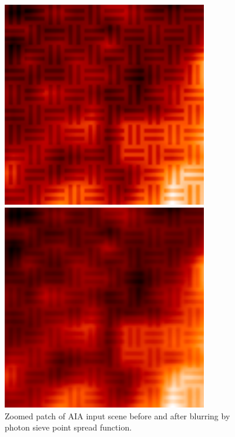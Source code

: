 \documentclass[tocnosub,noragright,centerchapter,12pt]{uiucecethesis09}
\begin{document}
\begin{figure}
  \centering
  \begin{minipage}{.5\textwidth}
    \centering
    \includegraphics[width=0.8\textwidth]{figures/aia_modulate_zoom.png}
  \end{minipage}%
  \begin{minipage}{.5\textwidth}
    \centering
    \includegraphics[width=0.8\textwidth]{figures/aia_modulate_zoom_blur.png}
  \end{minipage}
  \caption{Zoomed patch of AIA input scene before and after blurring by photon sieve point spread function.}
  \label{fig:aia_blur}
\end{figure}
\end{document}
